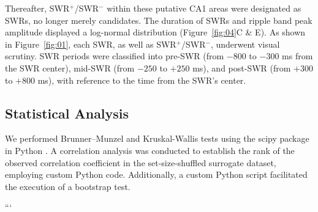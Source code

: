 Thereafter, SWR$^+$/SWR$^-$ within these putative CA1 areas were designated as SWRs, no longer merely candidates. The duration of SWRs and ripple band peak amplitude displayed a log-normal distribution (Figure~\ref{fig:04}C \& E). As shown in Figure~\ref{fig:01}, each SWR, as well as SWR$^+$/SWR$^-$, underwent visual scrutiny. SWR periods were classified into pre-SWR (from $-800$ to $-300$ ms from the SWR center), mid-SWR (from $-250$ to $+250$ ms), and post-SWR (from $+300$ to $+800$ ms), with reference to the time from the SWR's center.

\subsection{Statistical Analysis}
We performed Brunner--Munzel and Kruskal-Wallis tests using the scipy package in Python \cite{virtanen_scipy_2020}. A correlation analysis was conducted to establish the rank of the observed correlation coefficient in the set-size-shuffled surrogate dataset, employing custom Python code. Additionally, a custom Python script facilitated the execution of a bootstrap test.

\label{sec:methods}
```

